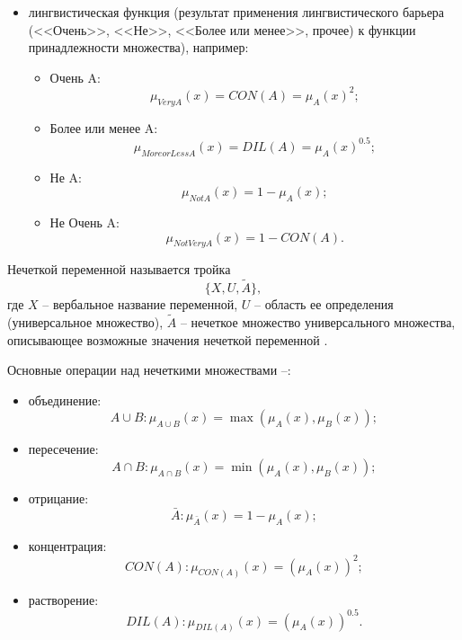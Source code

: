 \begin{itemize}
\begin{equation}
		\right.
	\end{equation}
	\item лингвистическая функция (результат применения лингвистического барьера (<<Очень>>, <<Не>>, <<Более или менее>>, прочее) к функции принадлежности множества), например:
	\begin{itemize}  
		\item Очень A:
		 \begin{equation}
			\mu_{Very A}(x) = CON(A) = \mu_A(x)^2;
			\end{equation}
		\item Более или менее A:
		 \begin{equation}
		\mu_{More or Less A}(x) = DIL(A) = \mu_A(x)^{0.5};
		\end{equation}
		\item Не A:
		 \begin{equation}
		\mu_{Not A}(x) = 1 - \mu_A(x);
		\end{equation}
		\item Не Очень A:
		 \begin{equation}
		 \label{eq:notVery}
		\mu_{Not Very A}(x) = 1 - CON(A).
		\end{equation}
	\end{itemize}
\end{itemize}

Нечеткой переменной называется тройка
\begin{equation}
\{X, U, \widetilde{A}\},
\end{equation}
где $X$ -- вербальное название переменной, $U$ -- область ее определения (универсальное множество), $\widetilde{A}$ -- нечеткое множество универсального множества, описывающее возможные значения нечеткой переменной \cite{IncrEfficiency}.

Основные операции над нечеткими множествами \cite{FuzRegul}--\cite{ExpSystems}:
\begin{itemize}
	\item объединение:
	\begin{equation}
	\label{eq:cup}
	A \cup B: \mu_{A \cup B}(x) = \max(\mu_A(x), \mu_B(x));
	\end{equation}
	\item пересечение:
	\begin{equation}
	\label{eq:cap}
	A \cap B: \mu_{A \cap B}(x) = \min(\mu_A(x), \mu_B(x));
	\end{equation}
	\item отрицание:
	\begin{equation}
	\label{eq:neg}
	\bar A: \mu_{\bar A}(x) = 1 - \mu_{A}(x);
	\end{equation}
	\item концентрация:
	\begin{equation}
	\label{eq:con}
	CON(A): \mu_{CON(A)}(x) = (\mu_A(x))^2;
	\end{equation}
	\item растворение:
	\begin{equation}
	\label{eq:dil}
	DIL(A): \mu_{DIL(A)}(x) = (\mu_A(x))^{0.5}.
	\end{equation}
\end{itemize}

